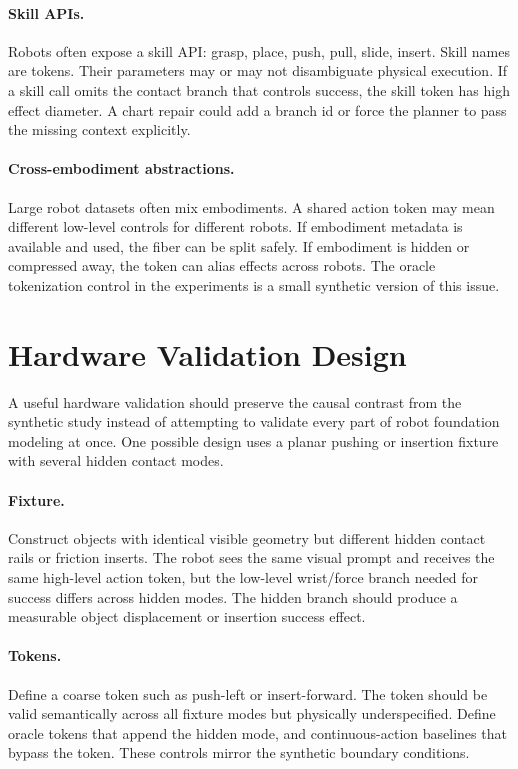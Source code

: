 \documentclass{article}
\begin{document}
\paragraph{Skill APIs.}
Robots often expose a skill API: grasp, place, push, pull, slide, insert. Skill
names are tokens. Their parameters may or may not disambiguate physical
execution. If a skill call omits the contact branch that controls success, the
skill token has high effect diameter. A chart repair could add a branch id or
force the planner to pass the missing context explicitly.

\paragraph{Cross-embodiment abstractions.}
Large robot datasets often mix embodiments. A shared action token may mean
different low-level controls for different robots. If embodiment metadata is
available and used, the fiber can be split safely. If embodiment is hidden or
compressed away, the token can alias effects across robots. The oracle
tokenization control in the experiments is a small synthetic version of this
issue.

\section{Hardware Validation Design}

A useful hardware validation should preserve the causal contrast from the
synthetic study instead of attempting to validate every part of robot foundation
modeling at once. One possible design uses a planar pushing or insertion
fixture with several hidden contact modes.

\paragraph{Fixture.}
Construct objects with identical visible geometry but different hidden contact
rails or friction inserts. The robot sees the same visual prompt and receives
the same high-level action token, but the low-level wrist/force branch needed
for success differs across hidden modes. The hidden branch should produce a
measurable object displacement or insertion success effect.

\paragraph{Tokens.}
Define a coarse token such as push-left or insert-forward. The token should be
valid semantically across all fixture modes but physically underspecified.
Define oracle tokens that append the hidden mode, and continuous-action
baselines that bypass the token. These controls mirror the synthetic boundary
conditions.
\end{document}
